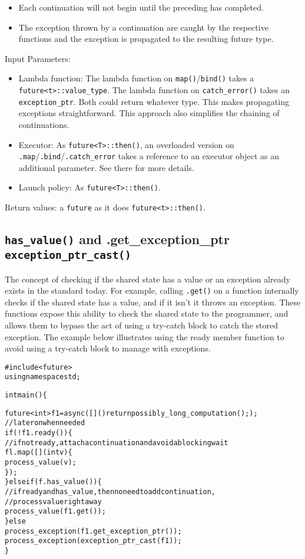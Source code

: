 \documentclass[a4paper,10pt]{article}
\newcommand{\cpp}[1]{\lstinline{#1}}
\newcommand{\suppress}[1]{\colorbox{suppress_color}{#1}}
\newcommand{\update}[1]{\colorbox{update_color}{#1}}
\begin{document}
\begin{itemize}
\item Each continuation will not begin until the preceding has completed.
\item The exception thrown by a continuation are caught by the respective functions and the exception is propagated to the resulting future type. 
\end{itemize}

Input Parameters: 

\begin{itemize}
\item Lambda function: The lambda function on \cpp{map()}/\cpp{bind()} takes a 
\cpp{future<t>::value_type}. The lambda function on \cpp{catch_error()} takes an \cpp{exception_ptr}. Both could return whatever type. This makes propagating exceptions straightforward. This approach also simplifies the chaining of continuations.
 
\item Executor: As \cpp{future<T>::then()}, an overloaded version on \cpp{.map}/\cpp{.bind}/\cpp{.catch_error} takes a reference to an executor object as an additional parameter. See there for more details.

\item Launch policy: As \cpp{future<T>::then()}. 
\end{itemize}

Return values: a \cpp{future} as it does \cpp{future<t>::then()}.

\subsection{\cpp{has_value()}  and  \suppress{.get_exception_ptr}\update{ \cpp{exception_ptr_cast()}}}

The concept of checking if the shared state has a value or an exception already exists in the standard today. For example, calling 
\cpp{.get()} on a function internally checks if the shared state has a value, and if it isn't it throws an exception. These functions expose this ability to check the shared state to the programmer, and allows them to bypass the act of using a try-catch block to catch the stored exception. The example below illustrates using the ready member function to avoid using a try-catch block to manage with exceptions.

\begin{alltt}
#include <future> 
using namespace std; 

int main() \{ 
 
  future<int> f1 = async([]() { return possibly_long_computation(); }); 
  // later on when needed 
  if(!f1.ready()) \{ 
    //if not ready, attach a continuation and avoid a blocking wait 
    fl.map([] (int v) \{ 
      process_value(v); 
    \}); 
  \} else if (f.has_value()) \{ 
  //if ready and has_value, then no need to add continuation, 
  // process value right away 
      process_value(f1.get()); 
  \} else
  \suppress{    process_exception(f1.get_exception_ptr()); }
  \update{    process_exception(exception_ptr_cast(f1)); }
\} 
\end{alltt}
\end{document}
